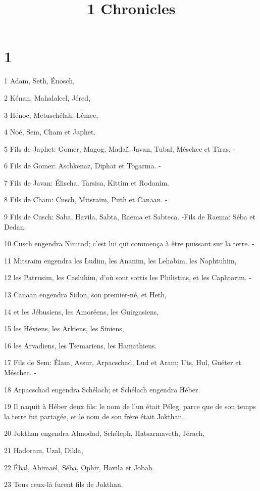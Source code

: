 

\title{1 Chronicles}


\chapter{1}

\par 1 Adam, Seth, Énosch,
\par 2 Kénan, Mahalaleel, Jéred,
\par 3 Hénoc, Metuschélah, Lémec,
\par 4 Noé, Sem, Cham et Japhet.
\par 5 Fils de Japhet: Gomer, Magog, Madaï, Javan, Tubal, Méschec et Tiras. -
\par 6 Fils de Gomer: Aschkenaz, Diphat et Togarma. -
\par 7 Fils de Javan: Élischa, Tarsisa, Kittim et Rodanim.
\par 8 Fils de Cham: Cusch, Mitsraïm, Puth et Canaan. -
\par 9 Fils de Cusch: Saba, Havila, Sabta, Raema et Sabteca. -Fils de Raema: Séba et Dedan.
\par 10 Cusch engendra Nimrod; c'est lui qui commença à être puissant sur la terre. -
\par 11 Mitsraïm engendra les Ludim, les Ananim, les Lehabim, les Naphtuhim,
\par 12 les Patrusim, les Casluhim, d'où sont sortis les Philistins, et les Caphtorim. -
\par 13 Canaan engendra Sidon, son premier-né, et Heth,
\par 14 et les Jébusiens, les Amoréens, les Guirgasiens,
\par 15 les Héviens, les Arkiens, les Siniens,
\par 16 les Arvadiens, les Tsemariens, les Hamathiens.
\par 17 Fils de Sem: Élam, Assur, Arpacschad, Lud et Aram; Uts, Hul, Guéter et Méschec. -
\par 18 Arpacschad engendra Schélach; et Schélach engendra Héber.
\par 19 Il naquit à Héber deux fils: le nom de l'un était Péleg, parce que de son temps la terre fut partagée, et le nom de son frère était Jokthan.
\par 20 Jokthan engendra Almodad, Schéleph, Hatsarmaveth, Jérach,
\par 21 Hadoram, Uzal, Dikla,
\par 22 Ébal, Abimaël, Séba, Ophir, Havila et Jobab.
\par 23 Tous ceux-là furent fils de Jokthan.
